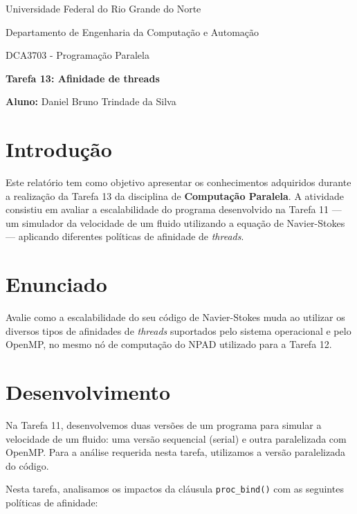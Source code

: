 \documentclass[a4paper, 12pt]{article}
\begin{document}
	\begin{center}
		Universidade Federal do Rio Grande do Norte
		
		Departamento de Engenharia da Computação e Automação  
		
		DCA3703 - Programação Paralela  
		
		\textbf{Tarefa 13: Afinidade de threads}  
		
		\textbf{Aluno:} Daniel Bruno Trindade da Silva  
	\end{center}  
	
	\section{Introdução}
	
	\hspace{0.62cm}Este relatório tem como objetivo apresentar os conhecimentos adquiridos durante a realização da Tarefa 13 da disciplina de \textbf{Computação Paralela}. A atividade consistiu em avaliar a escalabilidade do programa desenvolvido na Tarefa 11 — um simulador da velocidade de um fluido utilizando a equação de Navier-Stokes — aplicando diferentes políticas de afinidade de \textit{threads}.
	
	\section{Enunciado}
	
	\hspace{0.62cm}Avalie como a escalabilidade do seu código de Navier-Stokes muda ao utilizar os diversos tipos de afinidades de \textit{threads} suportados pelo sistema operacional e pelo OpenMP, no mesmo nó de computação do NPAD utilizado para a Tarefa 12.
	
	\section{Desenvolvimento}
	
	\hspace{0.62cm}Na Tarefa 11, desenvolvemos duas versões de um programa para simular a velocidade de um fluido: uma versão sequencial (serial) e outra paralelizada com OpenMP. Para a análise requerida nesta tarefa, utilizamos a versão paralelizada do código.
	
	\hspace{0.62cm}Nesta tarefa, analisamos os impactos da cláusula \texttt{proc\_bind()} com as seguintes políticas de afinidade:
	
\end{document}
